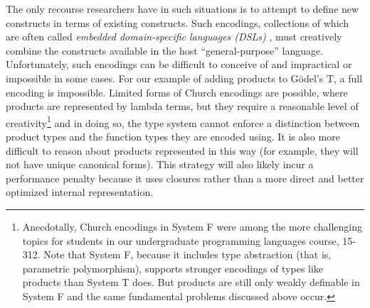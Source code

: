 The only recourse researchers have in such situations is to attempt to define new constructs in terms of existing constructs. Such encodings, collections of which are often called \emph{embedded domain-specific languages (DSLs)} \cite{fowler2010domain}, must creatively combine the constructs available in the host ``general-purpose'' language. Unfortunately, such encodings can be difficult to conceive of and impractical or impossible in some cases. For our example of adding products to G\"odel's T, a full encoding is impossible. Limited forms of Church encodings are possible, where products are represented by lambda terms, but they require a reasonable level of creativity\footnote{Anecdotally, Church encodings in System F  were among the more challenging topics for students in our undergraduate programming languages course, 15-312. Note that System F, because it includes type abstraction (that is, parametric polymorphism), supports stronger encodings of types like products than System T does. But products are still only weakly definable in System F and the same fundamental problems discussed above occur.} and in doing so, the type system cannot enforce a distinction between product types and the function types they are encoded using. It is also more difficult to reason about products represented in this way (for example, they will not have unique canonical forms). This strategy will also likely incur a performance penalty because it uses closures rather than a more direct and better optimized internal representation. 



